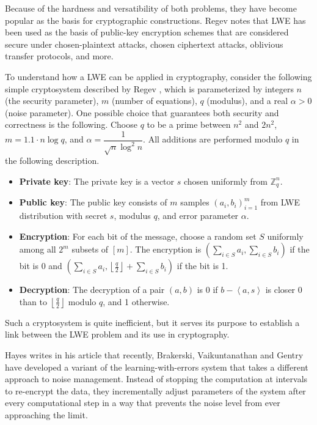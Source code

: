 Because of the hardness and versatibility of both problems, they have become popular as the basis for cryptographic constructions. Regev \cite{regevlearning} notes that LWE has been used as the basis of public-key encryption schemes that are considered secure under chosen-plaintext attacks, chosen ciphertext attacks, oblivious transfer protocols, and more.

To understand how a LWE can be applied in cryptography, consider the following simple cryptosystem described by Regev \cite{regevlearning}, which is parameterized by integers $n$ (the security parameter), $m$ (number of equations), $q$ (modulus), and a real $\alpha > 0$ (noise parameter). One possible choice that guarantees both security and correctness is the following. Choose $q$ to be a prime between $n^2$ and $2n^2$, $m=1.1 \cdot n\log q$, and $\alpha = \dfrac{1}{\sqrt{n} \log^{2}n}$. All additions are performed modulo $q$ in the following description. 

\begin{itemize}
\item \textbf{Private key}: The private key is a vector $s$ chosen uniformly from $\mathbb{Z}_{q}^{n}$.
\item \textbf{Public key}: The public key consists of $m$ samples $(a_{i}, b_{i})_{i=1}^m$ from LWE distribution with secret $s$, modulus $q$, and error parameter $\alpha$.
\item \textbf{Encryption}: For each bit of the message, choose a random set $S$ uniformly among all $2^m$ subsets of $[m]$. The encryption is $(\sum_{i \in S} a_{i}, \sum_{i \in S} b_{i})$ if the bit is 0 and $(\sum_{i \in S} a_{i}, \left \lfloor{\frac{q}{2}}\right \rfloor + \sum_{i \in S} b_{i})$ if the bit is 1.
\item \textbf{Decryption}: The decryption of a pair $(a,b)$ is 0 if $b - \left \langle a,s \right \rangle$ is closer 0 than to $\left \lfloor \frac{q}{2} \right \rfloor$ modulo $q$, and 1 otherwise. 
\end{itemize}
Such a cryptosystem is quite inefficient, but it serves its purpose to establish a link between the LWE problem and its use in cryptography.

Hayes \cite{Hayes2012} writes in his article that recently, Brakerski, Vaikuntanathan and Gentry have developed a variant of the learning-with-errors system that takes a different approach to noise management. Instead of stopping the computation at intervals to re-encrypt the data, they incrementally adjust parameters of the system after every computational step in a way that prevents the noise level from ever approaching the limit.

